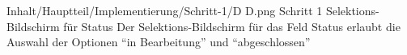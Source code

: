 \begin{alexfigure}{Inhalt/Hauptteil/Implementierung/Schritt-1/D D.png}
  {Schritt 1 Selektions-Bildschirm für Status}
  {Der Selektions-Bildschirm für das Feld Status erlaubt die Auswahl der Optionen \enquote{in Bearbeitung} und \enquote{abgeschlossen}}

  \label{fig:Schritt1SelektionsBildschirmStatus}

\end{alexfigure}


